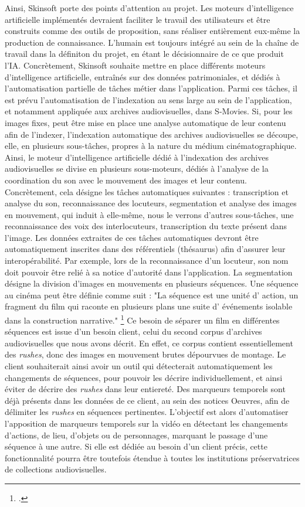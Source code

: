 Ainsi, Skinsoft porte des points d'attention au projet. Les moteurs d'intelligence artificielle implémentés devraient faciliter le travail des utilisateurs et être construits comme des outils de proposition, sans réaliser entièrement eux-même la production de connaissance. L'humain est toujours intégré au sein de la chaîne de travail dans la définiton du projet, en étant le décisionnaire de ce que produit l'IA. 
Concrètement, Skinsoft souhaite mettre en place différents moteurs d'intelligence artificielle, entraînés sur des données patrimoniales, et dédiés à l'automatisation partielle de tâches métier dans l'application. Parmi ces tâches, il est prévu l'automatisation de l'indexation au sens large au sein de l'application, et notamment appliquée aux archives audiovisuelles, dans S-Movies. Si, pour les images fixes, peut être mise en place une analyse automatique de leur contenu afin de l'indexer, 
l'indexation automatique des archives audiovisuelles se découpe, elle, en plusieurs sous-tâches, propres à la nature du médium cinématographique. 
Ainsi, le moteur d'intelligence artificielle dédié à l'indexation des archives audiovisuelles se divise en plusieurs sous-moteurs, dédiés à l'analyse de la coordination du son avec le mouvement des images et leur contenu. Concrètement, cela désigne les tâches automatiques suivantes : transcription et analyse du son, reconnaissance des locuteurs, segmentation et analyse des images en mouvement, qui induit à elle-même, nous le verrons d'autres sous-tâches, une reconnaissance des voix des interlocuteurs, transcription du texte présent dans l'image. Les données extraites de ces tâches automatiques devront être automatiquement inscrites dans des référentiels (thésaurus) afin d'assurer leur interopérabilité. Par exemple, lors de la reconnaissance d'un locuteur, son nom doit pouvoir être relié à sa notice d'autorité dans l'application. 
La segmentation désigne la division d'images en mouvements en plusieurs séquences. Une séquence au cinéma peut être définie comme suit : "La séquence est une unité d' action, un fragment du film qui raconte en plusieurs plans une suite d' événements isolable dans la construction narrative." \footcite{journot2008}
Ce besoin de séparer un film en différentes séquences est issue d'un besoin client, celui du second corpus d'archives audiovisuelles que nous avons décrit. En effet, ce corpus contient essentiellement des \textit{rushes}, donc des images en mouvement brutes dépourvues de montage. Le client souhaiterait ainsi avoir un outil qui détecterait automatiquement les changements de séquences, pour pouvoir les décrire individuellement, et ainsi éviter de décrire des \textit{rushes} dans leur entiereté. Des marqueurs temporels sont déjà présents dans les données de ce client, au sein des notices Oeuvres, afin de délimiter les \textit{rushes} en séquences pertinentes. L'objectif est alors d'automatiser l'apposition de marqueurs temporels sur la vidéo en détectant les changements d'actions, de lieu, d'objets ou de personnages, marquant le passage d'une séquence à une autre. Si elle est dédiée au besoin d'un client précis, cette fonctionnalité pourra être toutefois étendue à toutes les institutions préservatrices de collections audiovisuelles.
 

